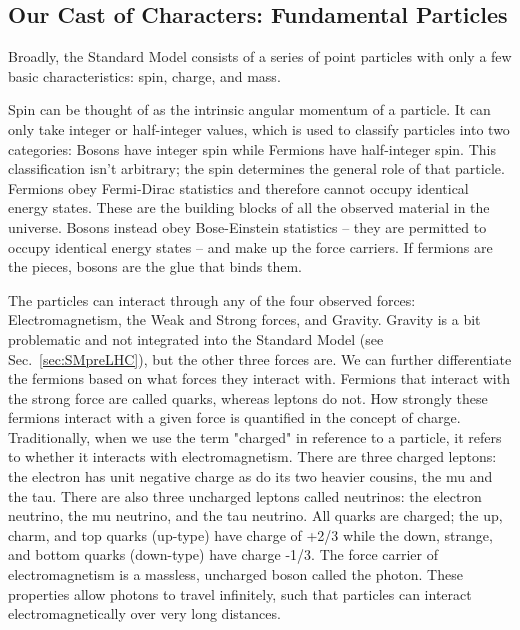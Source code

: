 \subsection{Our Cast of Characters: Fundamental Particles}
\label{sec:FundParticles}

Broadly, the Standard Model consists of a series of point particles with only a few basic characteristics: spin, charge, and mass.

Spin can be thought of as the intrinsic angular momentum of a particle. It can only take integer or half-integer values, which is used to classify particles into two categories: Bosons have integer spin while Fermions have half-integer spin. This classification isn't arbitrary; the spin determines the general role of that particle. Fermions obey Fermi-Dirac statistics and therefore cannot occupy identical energy states. These are the building blocks of all the observed material in the universe. Bosons instead obey Bose-Einstein statistics -- they are permitted to occupy identical energy states -- and make up the force carriers. If fermions are the pieces, bosons are the glue that binds them.

The particles can interact through any of the four observed forces: Electromagnetism, the Weak and Strong forces, and Gravity. Gravity is a bit problematic and not integrated into the Standard Model (see Sec.~\ref{sec:SMpreLHC}), but the other three forces are. We can further differentiate the fermions based on what forces they interact with. Fermions that interact with the strong force are called quarks, whereas leptons do not. How strongly these fermions interact with a given force is quantified in the concept of charge. Traditionally, when we use the term "charged" in reference to a particle, it refers to whether it interacts with electromagnetism. There are three charged leptons: the electron has unit negative charge as do its two heavier cousins, the mu and the tau. There are also three uncharged leptons called neutrinos: the electron neutrino, the mu neutrino, and the tau neutrino. All quarks are charged; the up, charm, and top quarks (up-type) have charge of +2/3 while the down, strange, and bottom quarks (down-type) have charge -1/3. The force carrier of electromagnetism is a massless, uncharged boson called the photon. These properties allow photons to travel infinitely, such that particles can interact electromagnetically over very long distances.

